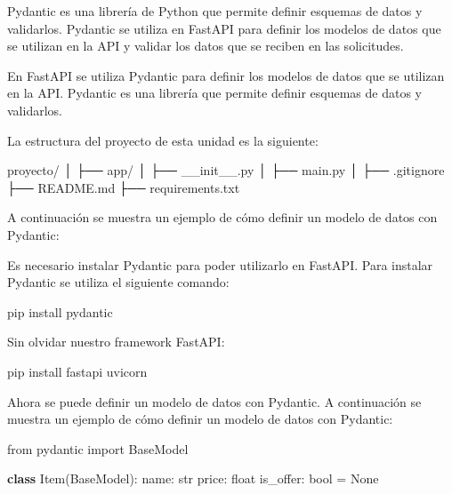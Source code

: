 \documentclass[
  a4paper,
  DIV=11,
  numbers=noendperiod,
  onepage,
  openany]{scrreprt}
\newenvironment{Shaded}{\begin{snugshade}}{\end{snugshade}}
\newcommand{\BuiltInTok}[1]{\textcolor[rgb]{0.00,0.23,0.31}{#1}}
\newcommand{\ExtensionTok}[1]{\textcolor[rgb]{0.00,0.23,0.31}{#1}}
\newcommand{\ImportTok}[1]{\textcolor[rgb]{0.00,0.46,0.62}{#1}}
\newcommand{\KeywordTok}[1]{\textcolor[rgb]{0.00,0.23,0.31}{\textbf{#1}}}
\newcommand{\NormalTok}[1]{\textcolor[rgb]{0.00,0.23,0.31}{#1}}
\newcommand{\OperatorTok}[1]{\textcolor[rgb]{0.37,0.37,0.37}{#1}}
\newcommand{\VariableTok}[1]{\textcolor[rgb]{0.07,0.07,0.07}{#1}}
\begin{document}
Pydantic es una librería de Python que permite definir esquemas de datos
y validarlos. Pydantic se utiliza en FastAPI para definir los modelos de
datos que se utilizan en la API y validar los datos que se reciben en
las solicitudes.

En FastAPI se utiliza Pydantic para definir los modelos de datos que se
utilizan en la API. Pydantic es una librería que permite definir
esquemas de datos y validarlos.

La estructura del proyecto de esta unidad es la siguiente:

\begin{Shaded}
\begin{Highlighting}[]
\NormalTok{proyecto/}
\NormalTok{│}
\NormalTok{├── app/}
\NormalTok{│   ├── \_\_init\_\_.py}
\NormalTok{│   ├── main.py}
\NormalTok{│}
\NormalTok{├── .gitignore}
\NormalTok{├── README.md}
\NormalTok{├── requirements.txt}
\end{Highlighting}
\end{Shaded}

A continuación se muestra un ejemplo de cómo definir un modelo de datos
con Pydantic:

Es necesario instalar Pydantic para poder utilizarlo en FastAPI. Para
instalar Pydantic se utiliza el siguiente comando:

\begin{Shaded}
\begin{Highlighting}[]
\ExtensionTok{pip}\NormalTok{ install pydantic}
\end{Highlighting}
\end{Shaded}

Sin olvidar nuestro framework FastAPI:

\begin{Shaded}
\begin{Highlighting}[]
\ExtensionTok{pip}\NormalTok{ install fastapi uvicorn}
\end{Highlighting}
\end{Shaded}

Ahora se puede definir un modelo de datos con Pydantic. A continuación
se muestra un ejemplo de cómo definir un modelo de datos con Pydantic:

\begin{Shaded}
\begin{Highlighting}[]
\ImportTok{from}\NormalTok{ pydantic }\ImportTok{import}\NormalTok{ BaseModel}

\KeywordTok{class}\NormalTok{ Item(BaseModel):}
\NormalTok{    name: }\BuiltInTok{str}
\NormalTok{    price: }\BuiltInTok{float}
\NormalTok{    is\_offer: }\BuiltInTok{bool} \OperatorTok{=} \VariableTok{None}
\end{Highlighting}
\end{Shaded}
\end{document}
